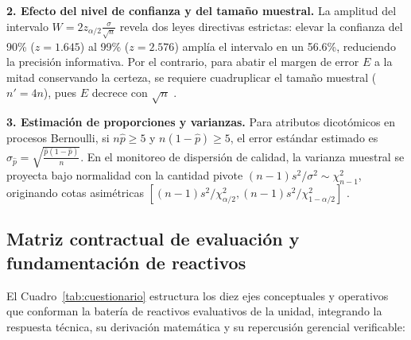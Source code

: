 {\textbf{2. Efecto del nivel de confianza y del tamaño muestral.} La amplitud del intervalo $W = 2 z_{\alpha/2}\frac{\sigma}{\sqrt{n}}$ revela dos leyes directivas estrictas: elevar la confianza del 90\% ($z = 1.645$) al 99\% ($z = 2.576$) amplía el intervalo en un 56.6\%, reduciendo la precisión informativa. Por el contrario, para abatir el margen de error $E$ a la mitad conservando la certeza, se requiere cuadruplicar el tamaño muestral ($n' = 4n$), pues $E$ decrece con $\sqrt{n}$ \citep{lind2012,nistHandbook}.

\textbf{3. Estimación de proporciones y varianzas.} Para atributos dicotómicos en procesos Bernoulli, si $n\hat{p} \ge 5$ y $n(1-\hat{p}) \ge 5$, el error estándar estimado es $\sigma_{\hat{p}} = \sqrt{\frac{\hat{p}(1-\hat{p})}{n}}$. En el monitoreo de dispersión de calidad, la varianza muestral se proyecta bajo normalidad con la cantidad pivote $(n-1)s^2/\sigma^2 \sim \chi^2_{n-1}$, originando cotas asimétricas $[(n-1)s^2/\chi^2_{\alpha/2}, (n-1)s^2/\chi^2_{1-\alpha/2}]$ \citep{canavos1988,wackerly2010}.

\subsection{Matriz contractual de evaluación y fundamentación de reactivos}
El Cuadro~\ref{tab:cuestionario} estructura los diez ejes conceptuales y operativos que conforman la batería de reactivos evaluativos de la unidad, integrando la respuesta técnica, su derivación matemática y su repercusión gerencial verificable:

}
